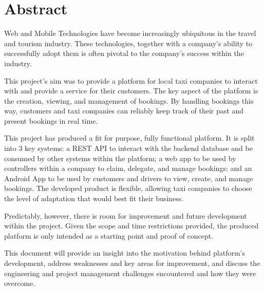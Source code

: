 \thispagestyle{empty}


\section*{\centering Abstract}

Web and Mobile Technologies have become increasingly ubiquitous in the travel and tourism industry. These technologies, together with a company's ability to successfully adopt them is often pivotal to the company's success within the industry.

This project's aim was to provide a platform for local taxi companies to interact with and provide a service for their customers. The key aspect of the platform is the creation, viewing, and management of bookings. By handling bookings this way, customers and taxi companies can reliably keep track of their past and present bookings in real time.

This project has produced a fit for purpose, fully functional platform. It is split into 3 key systems: a REST API to interact with the backend database and be consumed by other systems within the platform; a web app to be used by controllers within a company to claim, delegate, and manage bookings; and an Android App to be used by customers and drivers to view, create, and manage bookings. The developed product is flexible, allowing taxi companies to choose the level of adaptation that would best fit their business.

Predictably, however, there is room for improvement and future development within the project. Given the scope and time restrictions provided, the produced platform is only intended as a starting point and proof of concept.

This document will provide an insight into the motivation behind platform's development, address weaknesses and key areas for improvement, and discuss the engineering and project management challenges encountered and how they were overcome.

